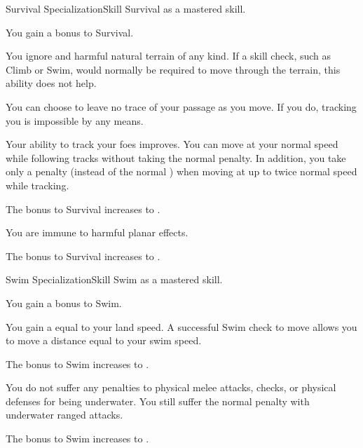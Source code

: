     \begin{feat}{Survival Specialization}{Skill}
        \featpre Survival as a mastered skill.
        \featben

         You gain a  bonus to Survival.

         You ignore  and harmful natural terrain of any kind.
        If a skill check, such as Climb or Swim, would normally be required to move through the terrain, this ability does not help.

         You can choose to leave no trace of your passage as you move.
        If you do, tracking you is impossible by any  means.

        Your ability to track your foes improves.
        You can move at your normal speed while following tracks without taking the normal  penalty.
        In addition, you take only a  penalty (instead of the normal ) when moving at up to twice normal speed while tracking.

         The bonus to Survival increases to .

         You are immune to harmful planar effects.

         The bonus to Survival increases to .
    \end{feat}

    \begin{feat}{Swim Specialization}{Skill}
        \featpre Swim as a mastered skill.
        \featben

         You gain a  bonus to Swim.

        \ff[2]{}

         You gain a  equal to your land speed.
        A successful Swim check to move allows you to move a distance equal to your swim speed.

         The bonus to Swim increases to .

         You do not suffer any penalties to physical melee attacks, checks, or physical defenses for being underwater.
        You still suffer the normal penalty with underwater ranged attacks.

         The bonus to Swim increases to .
    \end{feat}

